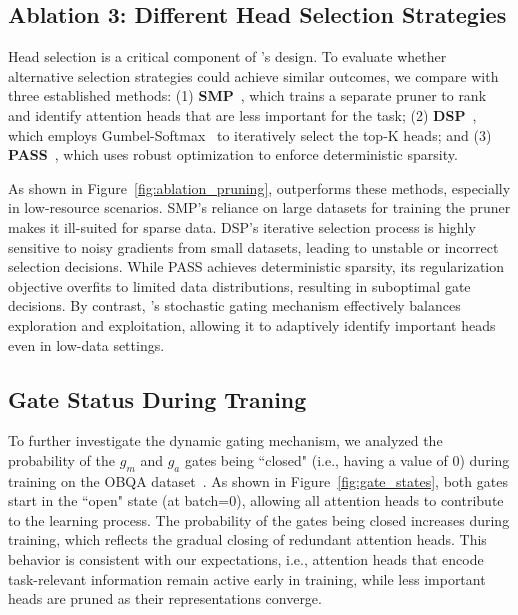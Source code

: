 

\subsection{Ablation 3: Different Head Selection Strategies}
\label{subsec:ablation_3}
Head selection is a critical component of \jola{}'s design.
To evaluate whether alternative selection strategies could achieve similar outcomes, we compare \jola{} with three established methods:
(1) \textbf{SMP}~\cite{zhang2021know}, which trains a separate pruner to rank and identify attention heads that are less important for the task;
(2) \textbf{DSP}~\cite{li-etal-2021-differentiable}, which employs Gumbel-Softmax~\cite{jang2017categorical} to iteratively select the top-K heads; and
(3) \textbf{PASS}~\cite{ding2024pass}, which uses robust optimization to enforce deterministic sparsity.

As shown in Figure~\ref{fig:ablation_pruning}, \jola{} outperforms these methods, especially in low-resource scenarios.
SMP's reliance on large datasets for training the pruner makes it ill-suited for sparse data.
DSP's iterative selection process is highly sensitive to noisy gradients from small datasets, leading to unstable or incorrect selection decisions.
While PASS achieves deterministic sparsity, its regularization objective overfits to limited data distributions, resulting in suboptimal gate decisions.
By contrast, \jola{}'s stochastic gating mechanism effectively balances exploration and exploitation, allowing it to adaptively identify important heads even in low-data settings.



\subsection{Gate Status During Traning}
\label{subsec:gate_states}

To further investigate the dynamic gating mechanism, we analyzed the probability of the $g_m$ and $g_a$ gates being ``closed" (i.e., having a value of 0) during training on the OBQA dataset~\cite{mihaylov-etal-2018-suit}.
As shown in Figure~\ref{fig:gate_states}, both gates start in the ``open" state (at batch=0), allowing all attention heads to contribute to the learning process.
The probability of the gates being closed increases during training, which reflects the gradual closing of redundant attention heads.
This behavior is consistent with our expectations, i.e., attention heads that encode task-relevant information remain active early in training, while less important heads are pruned as their representations converge.

